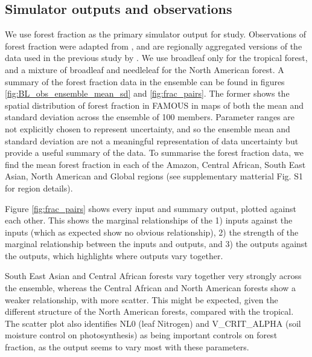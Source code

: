 \documentclass[esd, manuscript]{copernicus}
\begin{document}
\subsection{Simulator outputs and observations}\label{inputsoutputs}
We use forest fraction as the primary simulator output for study. Observations of forest fraction were adapted from \cite{loveland2000landcover}, and are regionally aggregated versions of the data used in the previous study by \cite{williams2013optimising}. We use broadleaf only for the tropical forest, and a mixture of broadleaf and needleleaf for the North American forest. A summary of the forest fraction data in the ensemble can be found in figures \ref{fig:BL_obs_ensemble_mean_sd} and \ref{fig:frac_pairs}.  The former shows the spatial distribution of forest fraction in FAMOUS in maps of both the mean and standard deviation across the ensemble of 100 members. Parameter ranges are not explicitly chosen to represent uncertainty, and so the ensemble mean and standard deviation are not a meaningful representation of data uncertainty but provide a useful summary of the data. To summarise the forest fraction data, we find the mean forest fraction in each of the Amazon, Central African, South East Asian, North American and Global regions (see supplementary matterial Fig. S1 for region details).

%

Figure \ref{fig:frac_pairs} shows every input and summary output, plotted against each other. This shows the marginal relationships of the 1) inputs against the inputs (which as expected show no obvious relationship), 2) the strength of the marginal relationship between the inputs and outputs, and 3) the outputs against the outputs, which highlights where outputs vary together.



South East Asian and Central African forests vary together very strongly across the ensemble, whereas the Central African and North American forests show a weaker relationship, with more scatter. This might be expected, given the different structure of the North American forests, compared with the tropical. The scatter plot also identifies NL0 (leaf Nitrogen) and V\_CRIT\_ALPHA (soil moisture control on photosynthesis) as being important controls on forest fraction, as the output seems to vary most with these parameters.
\end{document}
